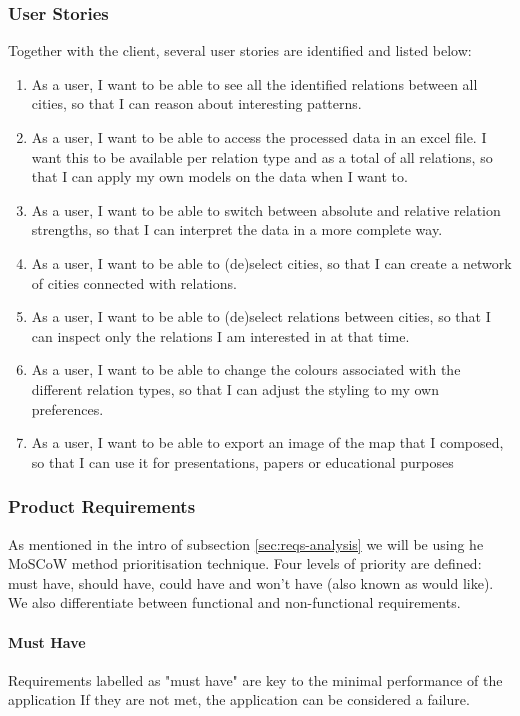 \subsubsection{User Stories}
Together with the client, several user stories are identified and listed below:
\begin{enumerate}
    \item As a user, I want to be able to see all the identified relations between all cities, so that I can reason about interesting patterns.
    \item As a user, I want to be able to access the processed data in an excel file. I want this to be available per relation type and as a total of all relations, so that I can apply my own models on the data when I want to.
    \item As a user, I want to be able to switch between absolute and relative relation strengths, so that I can interpret the data in a more complete way.
    \item As a user, I want to be able to (de)select cities, so that I can create a network of cities connected with relations.
    \item As a user, I want to be able to (de)select relations between cities, so that I can inspect only the relations I am interested in at that time.
    \item As a user, I want to be able to change the colours associated with the different relation types, so that I can adjust the styling to my own preferences.
    \item As a user, I want to be able to export an image of the map that I composed, so that I can use it for presentations, papers or educational purposes
\end{enumerate}


\subsubsection{Product Requirements}\label{sec:reqs}
As mentioned in the intro of subsection \ref{sec:reqs-analysis} we will be using he MoSCoW method prioritisation technique. Four levels of priority are defined: must have, should have, could have and won't have (also known as would like). We also differentiate between functional and non-functional requirements. 

\paragraph{Must Have}
Requirements labelled as "must have" are key to the minimal performance of the application If they are not met, the application can be considered a failure.

